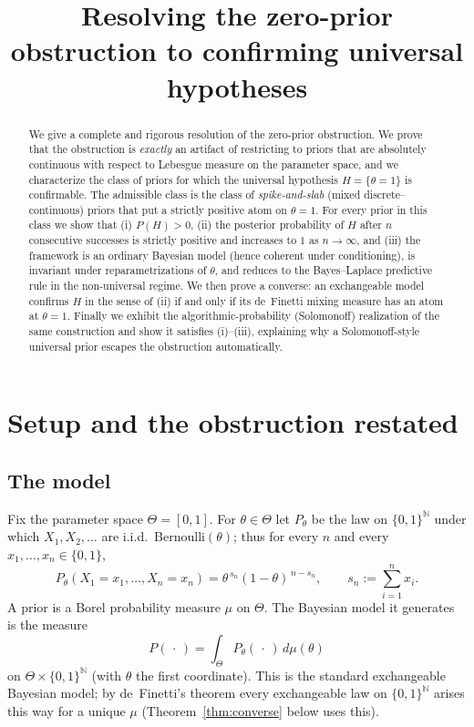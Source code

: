 \documentclass{amsart}
\theoremstyle{definition}
\newcommand{\N}{\mathbb{N}}
\begin{document}
\title{Resolving the zero-prior obstruction to confirming universal hypotheses}
\maketitle

\begin{abstract}
We give a complete and rigorous resolution of the zero-prior obstruction. We
prove that the obstruction is \emph{exactly} an artifact of restricting to
priors that are absolutely continuous with respect to Lebesgue measure on the
parameter space, and we characterize the class of priors for which the
universal hypothesis $H=\{\theta=1\}$ is confirmable. The admissible class is
the class of \emph{spike-and-slab} (mixed discrete--continuous) priors that put
a strictly positive atom on $\theta=1$. For every prior in this class we show
that (i) $P(H)>0$, (ii) the posterior probability of $H$ after $n$ consecutive
successes is strictly positive and increases to $1$ as $n\to\infty$, and (iii)
the framework is an ordinary Bayesian model (hence coherent under conditioning),
is invariant under reparametrizations of $\theta$, and reduces to the
Bayes--Laplace predictive rule in the non-universal regime. We then prove a
converse: an exchangeable model confirms $H$ in the sense of (ii) if and only if
its de~Finetti mixing measure has an atom at $\theta=1$. Finally we exhibit the
algorithmic-probability (Solomonoff) realization of the same construction and
show it satisfies (i)--(iii), explaining why a Solomonoff-style universal prior
escapes the obstruction automatically.
\end{abstract}

\section{Setup and the obstruction restated}\label{sec:setup}

\subsection{The model}
Fix the parameter space $\Theta=[0,1]$. For $\theta\in\Theta$ let $P_\theta$ be
the law on $\{0,1\}^\N$ under which $X_1,X_2,\dots$ are i.i.d.\ Bernoulli$(\theta)$;
thus for every $n$ and every $x_1,\dots,x_n\in\{0,1\}$,
\begin{equation}\label{eq:likelihood}
  P_\theta(X_1=x_1,\dots,X_n=x_n)=\theta^{\,s_n}(1-\theta)^{\,n-s_n},
  \qquad s_n:=\sum_{i=1}^n x_i .
\end{equation}
A prior is a Borel probability measure $\mu$ on $\Theta$. The Bayesian model it
generates is the measure
\begin{equation}\label{eq:joint}
  P(\,\cdot\,)=\int_{\Theta}P_\theta(\,\cdot\,)\,d\mu(\theta)
\end{equation}
on $\Theta\times\{0,1\}^\N$ (with $\theta$ the first coordinate). This is the
standard exchangeable Bayesian model; by de~Finetti's theorem every
exchangeable law on $\{0,1\}^\N$ arises this way for a unique $\mu$
(Theorem~\ref{thm:converse} below uses this).
\end{document}
